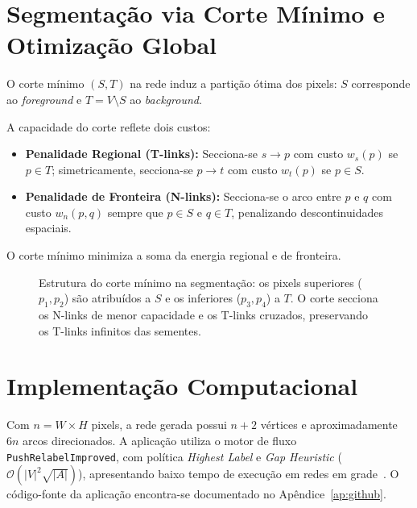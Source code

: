 \section{Segmentação via Corte Mínimo e Otimização Global}

O corte mínimo $(S, T)$ na rede induz a partição ótima dos pixels: $S$ corresponde ao \textit{foreground} e $T = V \setminus S$ ao \textit{background}.

A capacidade do corte reflete dois custos:
\begin{itemize}
    \item \textbf{Penalidade Regional (T-links):} Secciona-se $s \to p$ com custo $w_s(p)$ se $p \in T$; simetricamente, secciona-se $p \to t$ com custo $w_t(p)$ se $p \in S$.
    \item \textbf{Penalidade de Fronteira (N-links):} Secciona-se o arco entre $p$ e $q$ com custo $w_n(p, q)$ sempre que $p \in S$ e $q \in T$, penalizando descontinuidades espaciais.
\end{itemize}

O corte mínimo minimiza a soma da energia regional e de fronteira.

\begin{figure}[!ht]
\centering

\caption{Estrutura do corte mínimo na segmentação: os pixels superiores ($p_1, p_2$) são atribuídos a $S$ e os inferiores ($p_3, p_4$) a $T$. O corte secciona os N-links de menor capacidade e os T-links cruzados, preservando os T-links infinitos das sementes.}
\label{fig:segmentacao_corte}
\end{figure}


\section{Implementação Computacional}

Com $n = W \times H$ pixels, a rede gerada possui $n + 2$ vértices e aproximadamente $6n$ arcos direcionados. A aplicação utiliza o motor de fluxo \lstinline{PushRelabelImproved}, com política \textit{Highest Label} e \textit{Gap Heuristic} ($\mathcal{O}(|V|^2 \sqrt{|A|})$), apresentando baixo tempo de execução em redes em grade~\cite{goldberg1988new}. O código-fonte da aplicação encontra-se documentado no Apêndice~\ref{ap:github}.

